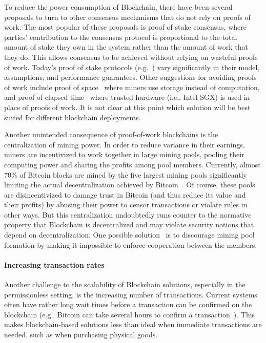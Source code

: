 To reduce the power consumption of Blockchain, there have been several proposals to turn to other consensus mechanisms that do not rely on proofs of work.  The most popular of these proposals is proof of stake consensus, where parties' contribution to the consensus protocol is proportional to the total amount of stake they own in the system rather than the amount of work that they do.  This allows consensus to be achieved without relying on wasteful proofs of work.  Today's proof of stake protocols (e.g.~\cite{FC:BenGabMiz16,eprint:BenPasShi16,CRYPTO:KRDO17,SOSP:GHMVZ17}) vary significantly in their model, assumptions, and performance guarantees.  Other suggestions for avoiding proofs of work include proof of space~\cite{CRYPTO:DFKP15, eprint:PPKAFG15} where miners use storage instead of computation, and proof of elapsed time~\cite{SSS:CXSGLS17} where trusted hardware (i.e., Intel SGX) is used in place of proofs of work.  It is not clear at this point which solution will be best suited for different blockchain deployments.  

Another unintended consequence of proof-of-work blockchains is the centralization of mining power.  In order to reduce variance in their earnings, miners are incentivized to work together in large mining pools, pooling their computing power and sharing the profits among pool members.  Currently, almost 70\% of Bitcoin blocks are mined by the five largest mining pools \cite{BlockchainInfoPools} significantly limiting the actual decentralization achieved by Bitcoin~\cite{arxiv:GBERS18}. Of course, these pools are disincentivized to damage trust in Bitcoin (and thus reduce its value and their profits) by abusing their power to censor transactions or violate rules in other ways. But this centralization undoubtedly runs counter to the normative property that Blockchain is decentralized and may violate security notions that depend on decentralization.  One possible solution~\cite{CCS:MKKS15} is to discourage mining pool formation by making it impossible to enforce cooperation between the members.

\paragraph{Increasing transaction rates}
Another challenge to the scalability of Blockchain solutions, especially in the permissionless setting, is the increasing number of transactions.
Current systems often have rather long wait times before a transaction can be confirmed on the blockchain (e.g., Bitcoin can take several hours to confirm a transaction~\cite{BlockchainInfoTransactionConfTime}).  This makes blockchain-based solutions less than ideal when immediate transactions are needed, such as when purchasing physical goods.

